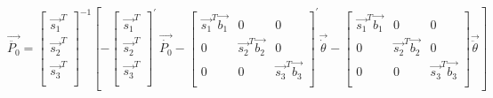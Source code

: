          \[ \overrightarrow{\ddot{P_{0}}}= \left[ \begin{matrix}
        \overrightarrow{s_{1}}^{T}\\
        \overrightarrow{s_{2}}^{T}\\
        \overrightarrow{s_{3}}^{T}\\
        \end{matrix}
         \right] ^{-1} \left[ - \left[ \begin{matrix}
        \overrightarrow{s_{1}}^{T}\\
        \overrightarrow{s_{2}}^{T}\\
        \overrightarrow{s_{3}}^{T}\\
        \end{matrix}
         \right] ^{'}~\overrightarrow{\dot{P_{0}}}- \left[ \begin{matrix}
        \overrightarrow{s_{1}}^{T}\overrightarrow{b_{1}}  &  0  &  0\\
        0  &  \overrightarrow{s_{2}}^{T}\overrightarrow{b_{2}}  &  0\\
        0  &  0  &  \overrightarrow{s_{3}}^{T}\overrightarrow{b_{3}}\\
        \end{matrix}
         \right] ^{'}\overrightarrow{\dot{ \theta }}- \left[ \begin{matrix}
        \overrightarrow{s_{1}}^{T}\overrightarrow{b_{1}}  &  0  &  0\\
        0  &  \overrightarrow{s_{2}}^{T}\overrightarrow{b_{2}}  &  0\\
        0  &  0  &  \overrightarrow{s_{3}}^{T}\overrightarrow{b_{3}}\\
        \end{matrix}
         \right] \overrightarrow{\ddot{ \theta }} \right] ~ \] 
        
